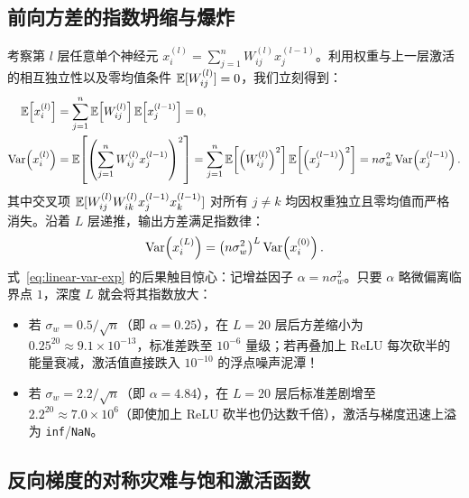\subsection{前向方差的指数坍缩与爆炸}

考察第 $l$ 层任意单个神经元 $x^{(l)}_i = \sum_{j=1}^{n} W^{(l)}_{ij} x^{(l-1)}_j$。利用权重与上一层激活的相互独立性以及零均值条件 $\mathbb{E}[W^{(l)}_{ij}] = 0$，我们立刻得到：
\begin{align*}
  \E\!\left[x^{(l)}_i\right] &= \sum_{j=1}^{n} \E\!\left[W^{(l)}_{ij}\right] \E\!\left[x^{(l-1)}_j\right] = 0, \\
  \Var\!\left(x^{(l)}_i\right) &= \E\!\left[\left(\sum_{j=1}^{n} W^{(l)}_{ij} x^{(l-1)}_j\right)^2\right]
  = \sum_{j=1}^{n} \E\!\left[\left(W^{(l)}_{ij}\right)^2\right] \E\!\left[\left(x^{(l-1)}_j\right)^2\right]
  = n \sigma_w^2 \Var\!\left(x^{(l-1)}_j\right).
\end{align*}
其中交叉项 $\mathbb{E}[W^{(l)}_{ij} W^{(l)}_{ik} x^{(l-1)}_j x^{(l-1)}_k]$ 对所有 $j \neq k$ 均因权重独立且零均值而严格消失。沿着 $L$ 层递推，输出方差满足指数律：
\begin{equation}
  \operatorname{Var}\!\left(x^{(L)}_i\right) = \left(n \sigma_w^2\right)^L \operatorname{Var}\!\left(x^{(0)}_i\right).
  \label{eq:linear-var-exp}
\end{equation}
式~\eqref{eq:linear-var-exp} 的后果触目惊心：记增益因子 $\alpha = n \sigma_w^2$。只要 $\alpha$ 略微偏离临界点 $1$，深度 $L$ 就会将其指数放大：
\begin{itemize}
  \item 若 $\sigma_w = 0.5 / \sqrt{n}$（即 $\alpha = 0.25$），在 $L = 20$ 层后方差缩小为 $0.25^{20} \approx 9.1 \times 10^{-13}$，标准差跌至 $10^{-6}$ 量级；若再叠加上 ReLU 每次砍半的能量衰减，激活值直接跌入 $10^{-10}$ 的浮点噪声泥潭！
  \item 若 $\sigma_w = 2.2 / \sqrt{n}$（即 $\alpha = 4.84$），在 $L = 20$ 层后标准差剧增至 $2.2^{20} \approx 7.0 \times 10^6$（即使加上 ReLU 砍半也仍达数千倍），激活与梯度迅速上溢为 \texttt{inf}/\texttt{NaN}。
\end{itemize}

\subsection{反向梯度的对称灾难与饱和激活函数}

